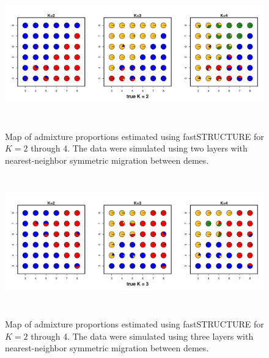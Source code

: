 \documentclass[12pt]{article}
\begin{document}
\begin{figure}
	\centering
		{\includegraphics[width=6in,height=2.25in]{figs/fastStr/fastStr_simK2_pies.pdf}}
	\caption{
	Map of admixture proportions estimated using fastSTRUCTURE \citep{fastStructure} for $K=2$ through 4.
	The data were simulated using two layers with nearest-neighbor symmetric migration between demes.
    }\label{fastStr_simK2}
\end{figure}

\begin{figure}
	\centering
		{\includegraphics[width=6in,height=2.25in]{figs/fastStr/fastStr_simK3_pies.pdf}}
	\caption{
	Map of admixture proportions estimated using fastSTRUCTURE \citep{fastStructure} for $K=2$ through 4.
	The data were simulated using three layers with nearest-neighbor symmetric migration between demes.
    }\label{fastStr_simK3}
\end{figure}
\end{document}
